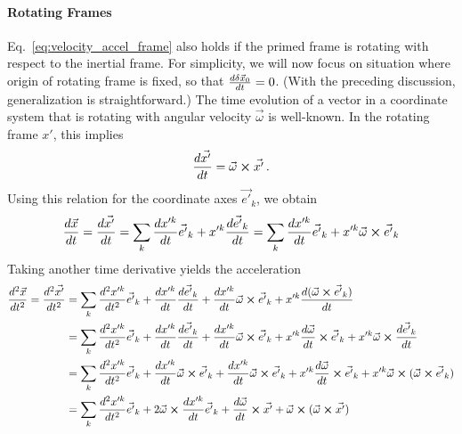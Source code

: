 \documentclass[../class_mech_main.tex]{subfiles}
\begin{document}
        \paragraph{Rotating Frames}

Eq.~\eqref{eq:velocity_accel_frame} also holds if the primed frame is rotating with respect to the inertial frame. For simplicity, we will now focus on situation where origin of rotating frame is fixed, so that $\dv{\delta \vec{x}_0}{t} = 0$. (With the preceding discussion, generalization is straightforward.) The time evolution of a vector in a coordinate system that is rotating with angular velocity $\vec{\omega}$ is well-known.  In the rotating frame $x'$, this implies
\begin{equation}
    \dv{\vec{x'}}{t} = \vec{\omega} \cross \vec{x'} \, .
\end{equation}
Using this relation for the coordinate axes $\vec{e'}_k$, we obtain
\begin{equation}
    \dv{\vec{x}}{t} = \dv{\vec{x'}}{t} = \sum_k \dv{x'^k}{t} \vec{e'}_k + x'^k \dv{\vec{e'}_k}{t} = \sum_k \dv{x'^k}{t} \vec{e'}_k + x'^k \vec{\omega} \cross \vec{e'}_k
\end{equation}
Taking another time derivative yields the acceleration
\begin{align}
    \dv[2]{\vec{x}}{t} = \dv[2]{\vec{x'}}{t}
    &= \sum_k \dv[2]{x'^k}{t} \vec{e'}_k + \dv{x'^k}{t} \dv{\vec{e'}_k}{t} + \dv{x'^k}{t} \vec{\omega} \cross \vec{e'}_k + x'^k \dv{(\vec{\omega} \cross \vec{e'}_k)}{t}
    \notag\\
    &= \sum_k \dv[2]{x'^k}{t} \vec{e'}_k + \dv{x'^k}{t} \dv{\vec{e'}_k}{t} + \dv{x'^k}{t} \vec{\omega} \cross \vec{e'}_k + x'^k \dv{\vec{\omega}}{t} \cross \vec{e'}_k + x'^k \vec{\omega} \cross \dv{\vec{e'}_k}{t}
    \notag\\
    &= \sum_k \dv[2]{x'^k}{t} \vec{e'}_k + \dv{x'^k}{t} \vec{\omega} \cross \vec{e'}_k + \dv{x'^k}{t} \vec{\omega} \cross \vec{e'}_k + x'^k \dv{\vec{\omega}}{t} \cross \vec{e'}_k + x'^k \vec{\omega} \cross (\vec{\omega} \cross \vec{e'}_k)
    \notag\\
    &= \sum_k \dv[2]{x'^k}{t} \vec{e'}_k + 2 \vec{\omega} \cross \dv{x'^k}{t} \vec{e'}_k + \dv{\vec{\omega}}{t} \cross \vec{x'} + \vec{\omega} \cross (\vec{\omega} \cross \vec{x'})
    \label{eq:accel_in_accel_frame}
\end{align}
\end{document}
